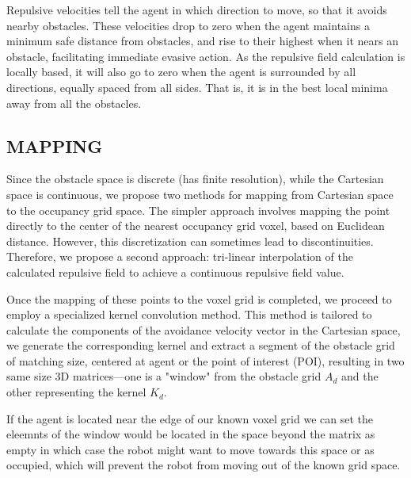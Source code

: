 \documentclass[letterpaper, 10 pt, conference]{ieeeconf}  %
\begin{document}

Repulsive velocities tell the agent in which direction to move, so that it avoids nearby obstacles. These velocities drop to zero when the agent maintains a minimum safe distance from obstacles, and rise to their highest when it nears an obstacle, facilitating immediate evasive action. As the repulsive field calculation is locally based, it will also go to zero when the agent is surrounded by all directions, equally spaced from all sides. That is, it is in the best local minima away from all the obstacles. 

\subsection{MAPPING}

Since the obstacle space is discrete (has finite resolution), while the Cartesian space is continuous, we propose two methods for mapping from Cartesian space to the occupancy grid space. The simpler approach involves mapping the point directly to the center of the nearest occupancy grid voxel, based on Euclidean distance. However, this discretization can sometimes lead to discontinuities. Therefore, we propose a second approach: tri-linear interpolation of the calculated repulsive field to achieve a continuous repulsive field value.

Once the mapping of these points to the voxel grid is completed, we proceed to employ a specialized kernel convolution method. This method is tailored to calculate the components of the avoidance velocity vector in the Cartesian space, we generate the corresponding kernel and extract a segment of the obstacle grid of matching size, centered at agent or the point of interest (POI), resulting in two same size 3D matrices—one is a "window" from the obstacle grid $A_d$ and the other representing the kernel $K_d$.

If the agent is located near the edge of our known voxel grid we can set the eleemnts of the window would be located in the space beyond the matrix as empty in which case the robot might want to move towards this space or as occupied, which will prevent the robot from moving out of the known grid space.
\end{document}
